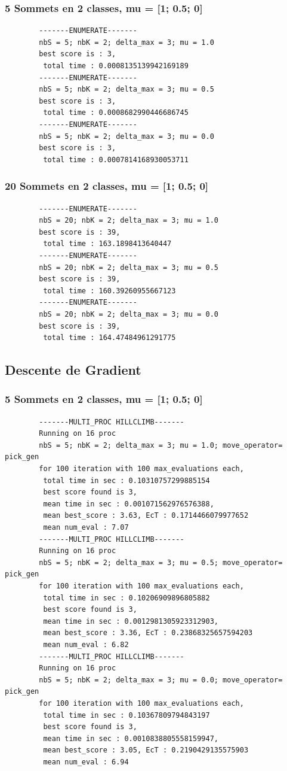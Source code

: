 \documentclass[a4paper]{article}
\begin{document}
		\subsubsection{5 Sommets en 2 classes, mu = [1; 0.5; 0]}
		\begin{verbatim}
		-------ENUMERATE-------
		nbS = 5; nbK = 2; delta_max = 3; mu = 1.0
		best score is : 3,
		 total time : 0.0008135139942169189
		-------ENUMERATE-------
		nbS = 5; nbK = 2; delta_max = 3; mu = 0.5
		best score is : 3,
		 total time : 0.0008682990446686745
		-------ENUMERATE-------
		nbS = 5; nbK = 2; delta_max = 3; mu = 0.0
		best score is : 3,
		 total time : 0.0007814168930053711
		\end{verbatim}
		\subsubsection{20 Sommets en 2 classes, mu = [1; 0.5; 0]}
		\begin{verbatim}
		-------ENUMERATE-------
		nbS = 20; nbK = 2; delta_max = 3; mu = 1.0
		best score is : 39,
		 total time : 163.1898413640447
		-------ENUMERATE-------
		nbS = 20; nbK = 2; delta_max = 3; mu = 0.5
		best score is : 39,
		 total time : 160.39260955667123
		-------ENUMERATE-------
		nbS = 20; nbK = 2; delta_max = 3; mu = 0.0
		best score is : 39,
		 total time : 164.47484961291775
		\end{verbatim}

	\subsection{Descente de Gradient}
		\subsubsection{5 Sommets en 2 classes, mu = [1; 0.5; 0]}
		\begin{verbatim}
		-------MULTI_PROC HILLCLIMB-------
		Running on 16 proc
		nbS = 5; nbK = 2; delta_max = 3; mu = 1.0; move_operator= pick_gen
		for 100 iteration with 100 max_evaluations each, 
		 total time in sec : 0.10310757299885154
		 best score found is 3,
		 mean time in sec : 0.001071562976576388,
		 mean best_score : 3.63, EcT : 0.1714466079977652
		 mean num_eval : 7.07
		-------MULTI_PROC HILLCLIMB-------
		Running on 16 proc
		nbS = 5; nbK = 2; delta_max = 3; mu = 0.5; move_operator= pick_gen
		for 100 iteration with 100 max_evaluations each, 
		 total time in sec : 0.10206909896805882
		 best score found is 3,
		 mean time in sec : 0.0012981305923312903,
		 mean best_score : 3.36, EcT : 0.23868325657594203
		 mean num_eval : 6.82
		-------MULTI_PROC HILLCLIMB-------
		Running on 16 proc
		nbS = 5; nbK = 2; delta_max = 3; mu = 0.0; move_operator= pick_gen
		for 100 iteration with 100 max_evaluations each, 
		 total time in sec : 0.10367809794843197
		 best score found is 3,
		 mean time in sec : 0.0010838805558159947,
		 mean best_score : 3.05, EcT : 0.2190429135575903
		 mean num_eval : 6.94
		\end{verbatim}
\end{document}
